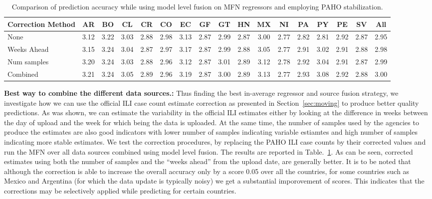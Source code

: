\begin{table}[tb!]
  \centering
  \caption{\label{tb:moving} Comparison of prediction accuracy while using model level fusion 
  on MFN regressors and employing PAHO stabilization.}
\vspace{1em}
\begin{tabular}{|p{1.5cm}|*{16}{c|}}
\hline
Correction Method& AR & BO & CL & CR & CO & EC & GF & GT & HN & MX & NI & PA & PY & PE & SV & All\\
\hline \hline
None             &3.12&3.22&3.03&2.88&2.98&3.13&2.87&2.99&2.87&3.00&2.77&2.82&2.81&2.92&2.87&2.95\\ \hline
Weeks Ahead      &3.15&3.24&3.04&2.87&2.97&3.17&2.87&2.99&2.88&3.05&2.77&2.91&3.02&2.91&2.88&2.98\\ \hline 
Num samples      &3.20&3.24&3.03&2.88&2.96&3.12&2.87&3.01&2.89&3.12&2.78&2.92&3.04&2.91&2.87&2.99\\ \hline
Combined         &3.21&3.24&3.05&2.89&2.96&3.19&2.87&3.00&2.89&3.13&2.77&2.93&3.08&2.92&2.88&3.00\\ 
\hline
\end{tabular}
\end{table}


{\noindent \textbf{Best way to combine the different data sources.: }} Thus finding the 
best in-average regressor and source fusion strategy, we investigate how we can use the 
official ILI case count estimate correction as presented in Section~\ref{sec:moving} to 
produce better quality predictions. As was shown, we can estimate the variability in the 
official ILI estimates either by looking at the difference in weeks between the day of upload 
and the week for which being the data is uploaded. At the same time, the number of samples used 
by the agencies to produce the estimates are also good indicators with lower number of samples
indicating variable estiamtes and high number of samples indicating more stable estimates. 
We test the correction procedures, by replacing the PAHO ILI case counts by their corrected values
and run the MFN over all data sources combined using model level fusion.
The results are reported in Table.~\ref{tb:moving}. As can be seen, corrected estimates 
using both the number of samples and 
the ``weeks ahead'' from the upload date, are generally better. It is to be noted that although
the correction is 
able to increase the overall accuracy only by a score 0.05 over all the countries, 
for some countries such as Mexico and Argentina (for which the data update is typically noisy) we get 
a substantial imporovement of scores. This indicates that the corrections may be selectively applied 
while predicting for certain countries. 



